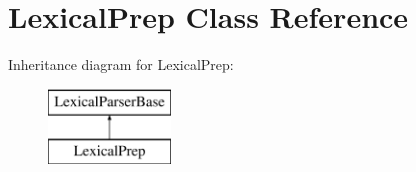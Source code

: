 \hypertarget{class_lexical_prep}{}\section{Lexical\+Prep Class Reference}
\label{class_lexical_prep}
Inheritance diagram for Lexical\+Prep\+:\begin{figure}[H]
\begin{center}
\leavevmode
\includegraphics[height=2.000000cm]{class_lexical_prep}
\end{center}
\end{figure}
